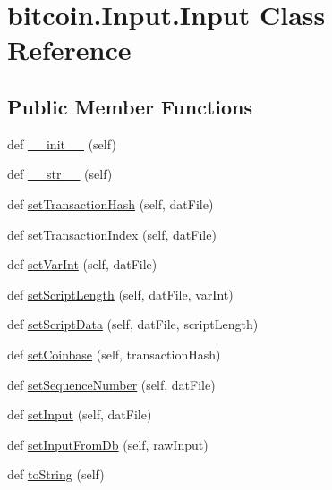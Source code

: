 \hypertarget{classbitcoin_1_1Input_1_1Input}{}\section{bitcoin.\+Input.\+Input Class Reference}
\label{classbitcoin_1_1Input_1_1Input}
\subsection*{Public Member Functions}
\begin{DoxyCompactItemize}
\item 
def \hyperlink{classbitcoin_1_1Input_1_1Input_ab31d15b86a6880c9eab2533354947f20}{\+\_\+\+\_\+init\+\_\+\+\_\+} (self)
\item 
def \hyperlink{classbitcoin_1_1Input_1_1Input_a3c5b1a5a11c6a1511f32e001e5a82c98}{\+\_\+\+\_\+str\+\_\+\+\_\+} (self)
\item 
def \hyperlink{classbitcoin_1_1Input_1_1Input_a6bcc429f5e147c3c8c73c8660dc95002}{set\+Transaction\+Hash} (self, dat\+File)
\item 
def \hyperlink{classbitcoin_1_1Input_1_1Input_a1eefef90c4b93f18165d06e797d6f9b2}{set\+Transaction\+Index} (self, dat\+File)
\item 
def \hyperlink{classbitcoin_1_1Input_1_1Input_adcc9738d1c700ee861778f9b4b48bf92}{set\+Var\+Int} (self, dat\+File)
\item 
def \hyperlink{classbitcoin_1_1Input_1_1Input_a8c03dc9d3b4e9d734a2bd682d50e196b}{set\+Script\+Length} (self, dat\+File, var\+Int)
\item 
def \hyperlink{classbitcoin_1_1Input_1_1Input_ae091140e691a8178a6b7087a91810615}{set\+Script\+Data} (self, dat\+File, script\+Length)
\item 
def \hyperlink{classbitcoin_1_1Input_1_1Input_a52023195faa922df92c10babbf5c151c}{set\+Coinbase} (self, transaction\+Hash)
\item 
def \hyperlink{classbitcoin_1_1Input_1_1Input_a00f41e8bf5a045caa508fa34d8ccb590}{set\+Sequence\+Number} (self, dat\+File)
\item 
def \hyperlink{classbitcoin_1_1Input_1_1Input_ac48118da0da987f907e0191740e77c41}{set\+Input} (self, dat\+File)
\item 
def \hyperlink{classbitcoin_1_1Input_1_1Input_a246cbb2d7511fd2cc99d269e6f2e29ad}{set\+Input\+From\+Db} (self, raw\+Input)
\item 
def \hyperlink{classbitcoin_1_1Input_1_1Input_a51f7fc2d5b373abdd7f1696ee1d7c413}{to\+String} (self)
\end{DoxyCompactItemize}
